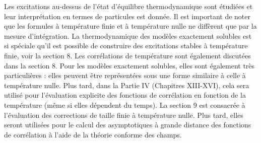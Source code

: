 Les excitations au-dessus de l'état d'équilibre thermodynamique sont étudiées et leur interprétation en termes de particules est donnée. Il est important de noter que les formules à température finie et à température nulle ne diffèrent que par la mesure d'intégration. La thermodynamique des modèles exactement solubles est si spéciale qu'il est possible de construire des excitations stables à température finie, voir la section 8. Les corrélations de température sont également discutées dans la section 8. Pour les modèles exactement solubles, elles sont également très particulières : elles peuvent être représentées sous une forme similaire à celle à température nulle. Plus tard, dans la Partie IV (Chapitres XIII-XVI), cela sera utilisé pour l'évaluation explicite des fonctions de corrélation en fonction de la température (même si elles dépendent du temps). La section 9 est consacrée à l'évaluation des corrections de taille finie à température nulle. Plus tard, elles seront utilisées pour le calcul des asymptotiques à grande distance des fonctions de corrélation à l'aide de la théorie conforme des champs.
